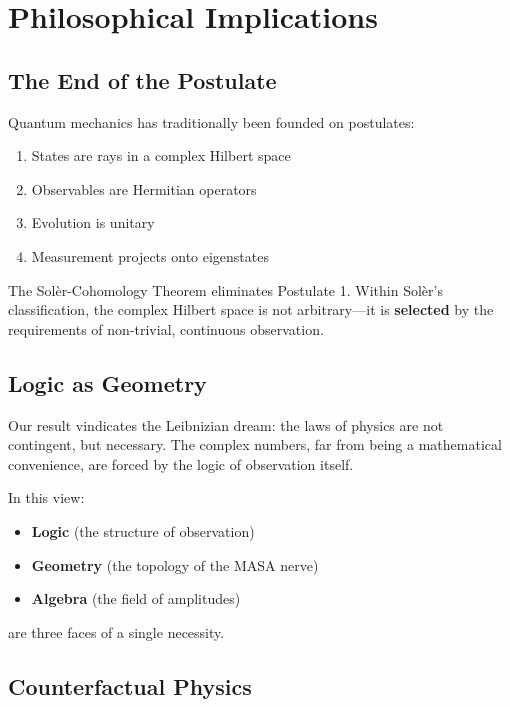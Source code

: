 \documentclass[11pt]{article}
\begin{document}
\section{Philosophical Implications}
\label{philosophical-implications}

\subsection{The End of the Postulate}
\label{the-end-of-the-postulate}

Quantum mechanics has traditionally been founded on postulates:
\begin{enumerate}
\item States are rays in a complex Hilbert space
\item Observables are Hermitian operators
\item Evolution is unitary
\item Measurement projects onto eigenstates
\end{enumerate}

The Sol\`{e}r-Cohomology Theorem eliminates Postulate 1. Within Sol\`{e}r's classification, the complex Hilbert space is not arbitrary---it is \textbf{selected} by the requirements of non-trivial, continuous observation.

\subsection{Logic as Geometry}
\label{logic-as-geometry}

Our result vindicates the Leibnizian dream: the laws of physics are not contingent, but necessary. The complex numbers, far from being a mathematical convenience, are forced by the logic of observation itself.

In this view:
\begin{itemize}
\item \textbf{Logic} (the structure of observation)
\item \textbf{Geometry} (the topology of the MASA nerve)
\item \textbf{Algebra} (the field of amplitudes)
\end{itemize}

are three faces of a single necessity.

\subsection{Counterfactual Physics}
\label{counterfactual-physics}
\end{document}

